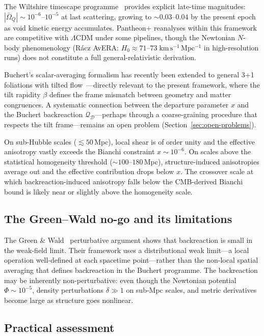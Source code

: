 The Wiltshire timescape programme~\cite{Wiltshire2024}
provides explicit late-time magnitudes:
$|\bar{\Omega}_Q| \sim 10^{-6}$--$10^{-5}$ at last
scattering, growing to $\sim\!0.03$--$0.04$ by the present
epoch as void kinetic energy accumulates.  Pantheon+
reanalyses within this framework are competitive with
$\Lambda$CDM under some pipelines, though the Newtonian
$N$-body phenomenology (R\'acz AvERA: $H_0 \approx
71$--$73\;\mathrm{km\,s^{-1}\,Mpc^{-1}}$ in high-resolution
runs) does not constitute a full general-relativistic
derivation.

Buchert's scalar-averaging formalism has recently been extended
to general 3+1 foliations with tilted
flow~\cite{BuchertMourierRoy2020}---directly relevant to the
present framework, where the tilt rapidity $\beta$ defines
the frame mismatch between geometry and matter congruences.
A systematic connection between the departure parameter $x$ and the
Buchert backreaction
$\mathcal{Q}_\mathcal{D}$---perhaps through a coarse-graining
procedure that respects the tilt frame---remains an open
problem (Section~\ref{sec:open-problems}).

On sub-Hubble scales ($\lesssim 50\,$Mpc), local shear is of
order unity and the effective anisotropy vastly exceeds the
Bianchi constraint $x \sim 10^{-6}$.  On scales above the
statistical homogeneity threshold
($\sim 100$--$180\,$Mpc), structure-induced anisotropies
average out and the effective contribution drops below $x$.
The crossover scale at which backreaction-induced anisotropy
falls below the CMB-derived Bianchi bound is likely near or
slightly above the homogeneity scale.


\subsection{The Green--Wald no-go and its limitations}

The Green \& Wald~\cite{GreenWald2011,GreenWald2014}
perturbative argument shows that backreaction is small in the
weak-field limit.  Their framework uses a distributional weak
limit---a local operation well-defined at each spacetime
point---rather than the non-local spatial averaging that defines
backreaction in the Buchert programme.  The backreaction may be
inherently non-perturbative: even though the Newtonian potential
$\Phi \sim 10^{-5}$, density perturbations $\delta \gg 1$ on
sub-Mpc scales, and metric derivatives become large as structure
goes nonlinear.


\subsection{Practical assessment}


